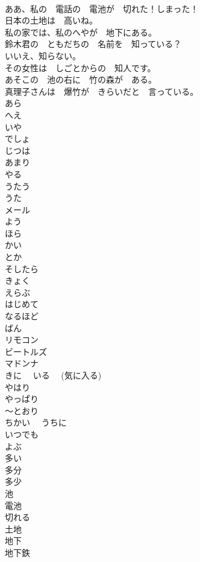\documentclass[8pt]{extreport}
\begin{document}
\begin{CJK}{UTF8}{min}
\\	ああ、私の　電話の　電池が　切れた！しまった！	
\\	日本の土地は　高いね。	
\\	私の家では、私のへやが　地下にある。	
\\	鈴木君の　ともだちの　名前を　知っている？	
\\	いいえ、知らない。	
\\	その女性は　しごとからの　知人です。	
\\	あそこの　池の右に　竹の森が　ある。	
\\	真理子さんは　爆竹が　きらいだと　言っている。	
\\	あら	
\\	へえ	
\\	いや	
\\	でしょ	
\\	じつは	
\\	あまり	
\\	やる	
\\	うたう	
\\	うた	
\\	メール	
\\	よう	
\\	ほら	
\\	かい	
\\	とか	
\\	そしたら	
\\	きょく	
\\	えらぶ	
\\	はじめて	
\\	なるほど	
\\	ばん	
\\	リモコン	
\\	ビートルズ	
\\	マドンナ	
\\	きに　 いる　 (気に入る)	
\\	やはり	
\\	やっぱり	
\\	～とおり	
\\	ちかい　 うちに	
\\	いつでも	
\\	よぶ	
\\	多い	
\\	多分	
\\	多少	
\\	池	
\\	電池	
\\	切れる	
\\	土地	
\\	地下	
\\	地下鉄	

\end{CJK}
\end{document}

